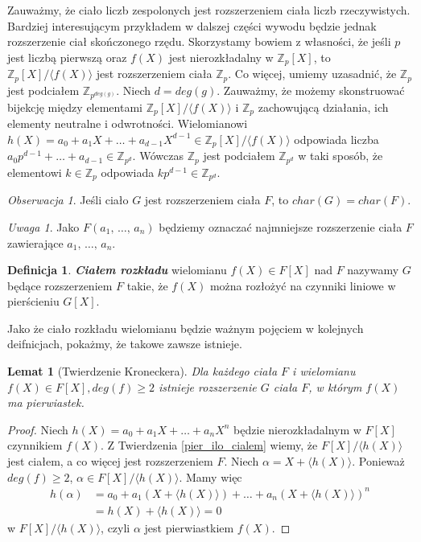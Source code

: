 \documentclass[declaration,shortabstract]{iithesis}
\theoremstyle{definition}
\newtheorem{definition}{Definicja}
\theoremstyle{remark} \newtheorem{observation}{Obserwacja}
\theoremstyle{plain} \newtheorem{theorem}{Twierdzenie}
\theoremstyle{plain} \newtheorem{lemma}{Lemat}
\theoremstyle{remark} \newtheorem*{remark*}{Uwaga}
\theoremstyle{reminder} \newtheorem*{reminder*}{Przypomnienie}
\begin{document}
Zauważmy, że ciało liczb zespolonych jest rozszerzeniem ciała liczb rzeczywistych. Bardziej interesującym przykładem w dalszej części wywodu będzie jednak rozszerzenie ciał skończonego rzędu. Skorzystamy bowiem z własności, że jeśli $p$ jest liczbą pierwszą oraz $f(X)$ jest nierozkładalny w $\mathbb{Z}_p[X]$, to $\mathbb{Z}_p[X]/\langle f(X)\rangle$ jest rozszerzeniem ciała $\mathbb{Z}_p$. Co więcej, umiemy uzasadnić, że $\mathbb{Z}_p$ jest podciałem $\mathbb{Z}_{p^{deg(g)}}$. Niech $d = deg(g)$. Zauważmy, że możemy skonstruować bijekcję między elementami $\mathbb{Z}_p[X]/\langle f(X)\rangle$ i $\mathbb{Z}_p$ zachowującą działania, ich elementy neutralne i odwrotności. Wielomianowi $h(X) = a_0 + a_1X + \ldots + a_{d-1}X^{d-1} \in \mathbb{Z}_p[X]/\langle f(X)\rangle$ odpowiada liczba $a_0p^{d-1} + \ldots + a_{d-1} \in \mathbb{Z}_{p^d}$. Wówczas $\mathbb{Z}_p$ jest podciałem $\mathbb{Z}_{p^d}$ w taki sposób, że elementowi $k \in \mathbb{Z}_p$ odpowiada $kp^{d-1} \in \mathbb{Z}_{p^d}$.

\begin{observation}\label{char1}
	Jeśli ciało $G$ jest rozszerzeniem ciała $F$, to $char(G)=char(F)$.
\end{observation}
	
\begin{remark*}
	Jako $F(a_1, \, \dots,\, a_n)$ będziemy oznaczać najmniejsze rozszerzenie ciała $F$ zawierające $a_1, \, \dots,\, a_n$.
\end{remark*}
	
\begin{definition}
	\textit{\textbf{Ciałem rozkładu}} wielomianu $f(X) \in F[X]$ nad $F$ nazywamy $G$ będące rozszerzeniem $F$ takie, że $f(X)$ można rozłożyć na czynniki liniowe w pierścieniu $G[X]$.
\end{definition}

Jako że ciało rozkładu wielomianu będzie ważnym pojęciem w kolejnych deifnicjach, pokażmy, że takowe zawsze istnieje. 
	
\begin{lemma}[Twierdzenie Kroneckera] \label{Kronecker}
	Dla każdego ciała $F$ i wielomianu $f(X) \in F[X], deg(f) \geq 2$ istnieje rozszerzenie $G$ ciała $F$, w którym $f(X)$ ma pierwiastek.
\end{lemma}
	
\begin{proof}
	Niech $h(X) = a_0 + a_1X + \dots + a_nX^n$ będzie nierozkładalnym w $F[X]$ czynnikiem $f(X)$. Z Twierdzenia \ref{pier_ilo_cialem} 
	wiemy, że $F[X]/\langle h(X) \rangle$ jest ciałem, a co więcej jest rozszerzeniem $F$.\newline
	Niech $\alpha = X + \langle h(X)\rangle$. Ponieważ $deg(f) \geq 2$, $\alpha \in F[X]/\langle h(X) \rangle$. Mamy więc 
	\begin{align*}
		h(\alpha) & = a_0 + a_1(X + \langle h(X)\rangle) + \dots + a_n(X+\langle h(X)\rangle)^n \\
		          & = h(X) + \langle h(X) \rangle = 0                                           
	\end{align*}
	w $F[X]/\langle h(X) \rangle$, czyli $\alpha$ jest pierwiastkiem $f(X)$.
\end{proof}
\end{document}
